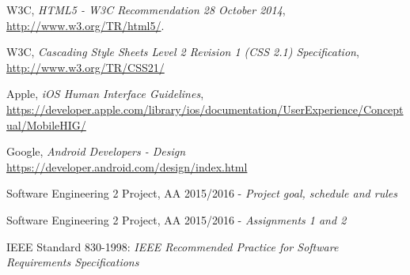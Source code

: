 \begin{thebibliography}{1}
  W3C,
  \emph{HTML5 - W3C Recommendation 28 October 2014}, \url{http://www.w3.org/TR/html5/}.

  W3C,
  \emph{Cascading Style Sheets Level 2 Revision 1 (CSS 2.1) Specification}, \url{http://www.w3.org/TR/CSS21/}

	Apple,
	\emph{iOS Human Interface Guidelines}, \url{https://developer.apple.com/library/ios/documentation/UserExperience/Conceptual/MobileHIG/}

	Google,
	\emph{Android Developers - Design}
	\url{https://developer.android.com/design/index.html}

	Software Engineering 2 Project, AA 2015/2016 - \emph{Project goal, schedule and rules}

	Software Engineering 2 Project, AA 2015/2016 - \emph{Assignments 1 and 2}

	IEEE Standard 830-1998: \emph{IEEE Recommended Practice for Software Requirements Specifications}

\end{thebibliography}
